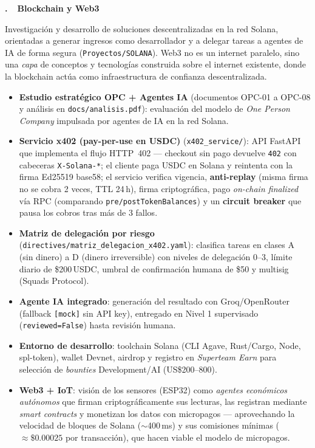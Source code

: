 \documentclass[a4paper,10pt]{article}
\newcounter{infosec}
\newcommand{\infosec}[2]{%
  \stepcounter{infosec}%
  \addcontentsline{toc}{section}{\protect\numberline{\theinfosec}#2}%
  \vspace{0.5cm}%
  \begin{tcolorbox}[colback=#1, colframe=#1, boxrule=0pt, arc=2pt,
      left=9pt, right=9pt, top=5pt, bottom=5pt]
    {\Large\bfseries\sffamily\color{white}\theinfosec.~~#2}
  \end{tcolorbox}%
  \vspace{0.15cm}%
}
\newenvironment{infocard}[1]
  {\begin{tcolorbox}[enhanced, breakable, colback=#1!5!white,
      colframe=#1!45!white, boxrule=0.8pt, arc=3pt,
      left=8pt, right=8pt, top=6pt, bottom=6pt]}
  {\end{tcolorbox}}
\begin{document}
\infosec{gviolet}{Blockchain y Web3}
\begin{infocard}{gviolet}
Investigación y desarrollo de soluciones descentralizadas en la red Solana,
orientadas a generar ingresos como desarrollador y a delegar tareas a agentes de
IA de forma segura (\texttt{Proyectos/SOLANA}). Web3 no es un internet paralelo,
sino una \textit{capa} de conceptos y tecnologías construida sobre el internet
existente, donde la blockchain actúa como infraestructura de confianza
descentralizada.
\begin{itemize}
    \item \textbf{Estudio estratégico OPC + Agentes IA} (documentos OPC-01 a OPC-08 y análisis en \texttt{docs/analisis.pdf}): evaluación del modelo de \textit{One Person Company} impulsada por agentes de IA en la red Solana.
    \item \textbf{Servicio x402 (pay-per-use en USDC)} (\texttt{x402\_service/}): API FastAPI que implementa el flujo HTTP~402 --- checkout sin pago devuelve \texttt{402} con cabeceras \texttt{X-Solana-*}; el cliente paga USDC en Solana y reintenta con la firma Ed25519 base58; el servicio verifica vigencia, \textbf{anti-replay} (misma firma no se cobra 2 veces, TTL 24\,h), firma criptográfica, pago \textit{on-chain finalized} vía RPC (comparando \texttt{pre/postTokenBalances}) y un \textbf{circuit breaker} que pausa los cobros tras más de 3 fallos.
    \item \textbf{Matriz de delegación por riesgo} (\texttt{directives/matriz\_delegacion\_x402.yaml}): clasifica tareas en clases A (sin dinero) a D (dinero irreversible) con niveles de delegación 0--3, límite diario de \$200\,USDC, umbral de confirmación humana de \$50 y multisig (Squads Protocol).
    \item \textbf{Agente IA integrado}: generación del resultado con Groq/OpenRouter (fallback \texttt{[mock]} sin API key), entregado en Nivel 1 supervisado (\texttt{reviewed=False}) hasta revisión humana.
    \item \textbf{Entorno de desarrollo}: toolchain Solana (CLI Agave, Rust/Cargo, Node, spl-token), wallet Devnet, airdrop y registro en \textit{Superteam Earn} para selección de \textit{bounties} Development/AI (US\$200--800).
    \item \textbf{Web3 + IoT}: visión de los sensores (ESP32) como \textit{agentes económicos autónomos} que firman criptográficamente sus lecturas, las registran mediante \textit{smart contracts} y monetizan los datos con micropagos --- aprovechando la velocidad de bloques de Solana ($\sim$400\,ms) y sus comisiones mínimas ($\approx\$0.00025$ por transacción), que hacen viable el modelo de micropagos.
\end{itemize}
\end{infocard}
\end{document}
